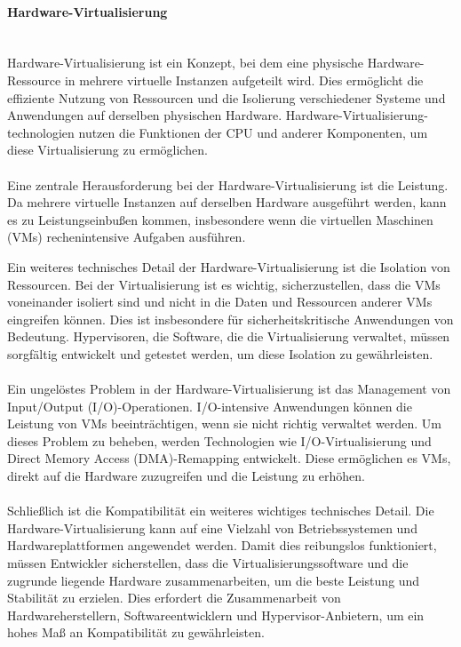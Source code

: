 \documentclass[../vs-script-first-v01.tex]{subfiles}
\begin{document}
\paragraph{Hardware-Virtualisierung}\mbox{}\\
Hardware-Virtualisierung ist ein Konzept, bei dem eine physische Hardware-Ressource in mehrere virtuelle Instanzen aufgeteilt wird. Dies ermöglicht die effiziente Nutzung von Ressourcen und die Isolierung verschiedener Systeme und Anwendungen auf derselben physischen Hardware. Hardware-Virtualisierung-technologien nutzen die Funktionen der CPU und anderer Komponenten, um diese Virtualisierung zu ermöglichen.
\\\\
Eine zentrale Herausforderung bei der Hardware-Virtualisierung ist die Leistung. Da mehrere virtuelle Instanzen auf derselben Hardware ausgeführt werden, kann es zu Leistungseinbußen kommen, insbesondere wenn die virtuellen Maschinen (VMs) rechenintensive Aufgaben ausführen.

Ein weiteres technisches Detail der Hardware-Virtualisierung ist die Isolation von Ressourcen. Bei der Virtualisierung ist es wichtig, sicherzustellen, dass die VMs voneinander isoliert sind und nicht in die Daten und Ressourcen anderer VMs eingreifen können. Dies ist insbesondere für sicherheitskritische Anwendungen von Bedeutung. Hypervisoren, die Software, die die Virtualisierung verwaltet, müssen sorgfältig entwickelt und getestet werden, um diese Isolation zu gewährleisten.
\\\\
Ein ungelöstes Problem in der Hardware-Virtualisierung ist das Management von Input/Output (I/O)-Operationen. I/O-intensive Anwendungen können die Leistung von VMs beeinträchtigen, wenn sie nicht richtig verwaltet werden. Um dieses Problem zu beheben, werden Technologien wie I/O-Virtualisierung und Direct Memory Access (DMA)-Remapping entwickelt. Diese ermöglichen es VMs, direkt auf die Hardware zuzugreifen und die Leistung zu erhöhen.
\\\\
Schließlich ist die Kompatibilität ein weiteres wichtiges technisches Detail. Die Hardware-Virtualisierung kann auf eine Vielzahl von Betriebssystemen und Hardwareplattformen angewendet werden. Damit dies reibungslos funktioniert, müssen Entwickler sicherstellen, dass die Virtualisierungssoftware und die zugrunde liegende Hardware zusammenarbeiten, um die beste Leistung und Stabilität zu erzielen. Dies erfordert die Zusammenarbeit von Hardwareherstellern, Softwareentwicklern und Hypervisor-Anbietern, um ein hohes Maß an Kompatibilität zu gewährleisten. 
\end{document}
